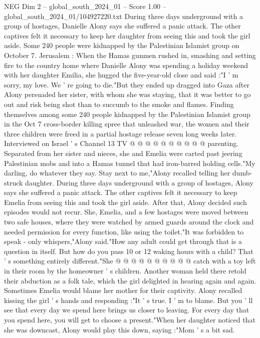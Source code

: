 \begin{textsample}{NEG Dim 2 – global\_south\_2024\_01 – Score 1.00 – global\_south\_2024\_01/104927220.txt}  \label{ex:f2_neg_323}
During three days underground with a group of hostages, Danielle Alony says she suffered a panic attack.
The other captives felt it necessary to keep her daughter from seeing this and took the girl aside.
Some 240 people were kidnapped by the Palestinian Islamist group on October 7.
Jerusalem : When the Hamas gunmen rushed in, smashing and setting fire to the country home where Danielle Alony was spending a holiday weekend with her daughter Emilia, she hugged the five-year-old close and said :"I ' m sorry, my love.
We ' re going to die."But they ended up dragged into Gaza after Alony persuaded her sister, with whom she was staying, that it was better to go out and risk being shot than to succumb to the smoke and flames.
Finding themselves among some 240 people kidnapped by the Palestinian Islamist group in the Oct 7 cross-border killing spree that unleashed war, the women and their three children were freed in a partial hostage release seven long weeks later.
Interviewed on Israel ' s Channel 13 TV @ @ @ @ @ @ @ @ @ @ parenting.
Separated from her sister and nieces, she and Emelia were carted past jeering Palestinian mobs and into a Hamas tunnel that had iron-barred holding cells."My darling, do whatever they say.
Stay next to me,"Alony recalled telling her dumb-struck daughter.
During three days underground with a group of hostages, Alony says she suffered a panic attack.
The other captives felt it necessary to keep Emelia from seeing this and took the girl aside.
After that, Alony decided such episodes would not recur.
She, Emelia, and a few hostages were moved between two safe houses, where they were watched by armed guards around the clock and needed permission for every function, like using the toilet."It was forbidden to speak - only whispers,"Alony said."How any adult could get through that is a question in itself.
But how do you pass 10 or 12 waking hours with a child?
That ' s something entirely different."She @ @ @ @ @ @ @ @ @ @ catch with a toy left in their room by the homeowner ' s children.
Another woman held there retold their abduction as a folk tale, which the girl delighted in hearing again and again.
Sometimes Emelia would blame her mother for their captivity.
Alony recalled kissing the girl ' s hands and responding :"It ' s true.
I ' m to blame.
But you ' ll see that every day we spend here brings us closer to leaving.
For every day that you spend here, you will get to choose a present."When her daughter noticed that she was downcast, Alony would play this down, saying :"Mom ' s a bit sad.

\end{textsample}
